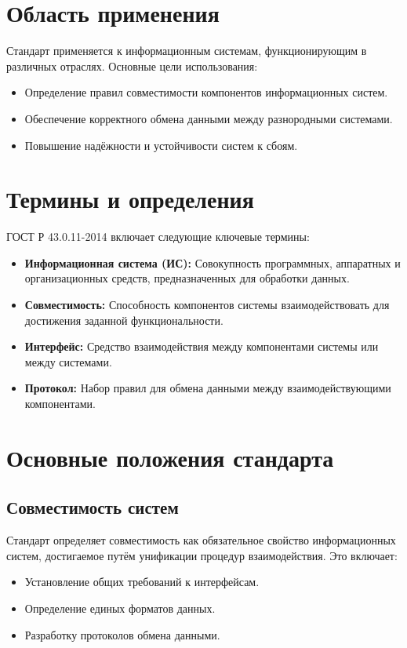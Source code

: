 \section*{Область применения}
Стандарт применяется к информационным системам, функционирующим в различных отраслях. Основные цели использования:
\begin{itemize}
    \item Определение правил совместимости компонентов информационных систем.
    \item Обеспечение корректного обмена данными между разнородными системами.
    \item Повышение надёжности и устойчивости систем к сбоям.
\end{itemize}

\section*{Термины и определения}
ГОСТ Р 43.0.11-2014 включает следующие ключевые термины:
\begin{itemize}
    \item \textbf{Информационная система (ИС):} Совокупность программных, аппаратных и организационных средств, предназначенных для обработки данных.
    \item \textbf{Совместимость:} Способность компонентов системы взаимодействовать для достижения заданной функциональности.
    \item \textbf{Интерфейс:} Средство взаимодействия между компонентами системы или между системами.
    \item \textbf{Протокол:} Набор правил для обмена данными между взаимодействующими компонентами.
\end{itemize}

\section*{Основные положения стандарта}

\subsection*{Совместимость систем}
Стандарт определяет совместимость как обязательное свойство информационных систем, достигаемое путём унификации процедур взаимодействия. Это включает:
\begin{itemize}
    \item Установление общих требований к интерфейсам.
    \item Определение единых форматов данных.
    \item Разработку протоколов обмена данными.
\end{itemize}

